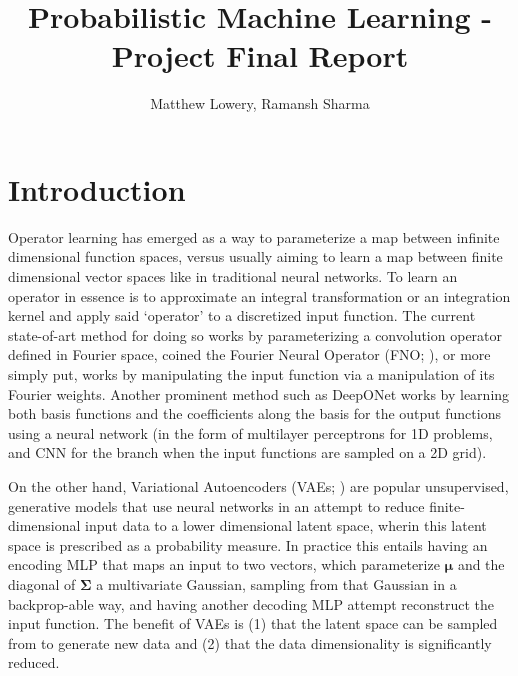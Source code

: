 \documentclass[11pt, fullpage,letterpaper]{article}
\title{Probabilistic Machine Learning - Project Final Report}
\author{Matthew Lowery, Ramansh Sharma}
\date{}
\begin{document}
\maketitle

\section{Introduction}

Operator learning has emerged as a way to parameterize a map between infinite dimensional function spaces, versus usually aiming to learn a map between finite dimensional vector spaces like in traditional neural networks. To learn an operator in essence is to approximate an integral transformation or an integration kernel and apply said `operator' to a discretized input function. The current state-of-art method for doing so works by parameterizing a convolution operator defined in Fourier space, coined the Fourier Neural Operator (FNO; \cite{li2021fourier}), or more simply put, works by manipulating the input function via a manipulation of its Fourier weights. Another prominent method such as DeepONet \cite{Lu_2021} works by learning both basis functions and the coefficients along the basis for the output functions using a neural network (in the form of multilayer perceptrons for 1D problems, and CNN for the branch when the input functions are sampled on a 2D grid).

On the other hand, Variational Autoencoders (VAEs; \cite{kingma2022autoencoding}) are popular unsupervised, generative models that use neural networks in an attempt to reduce finite-dimensional input data to a lower dimensional latent space, wherin this latent space is prescribed as a probability measure. In practice this entails having an encoding MLP that maps an input to two vectors, which parameterize $\mathbf{\mu}$ and the diagonal of $\mathbf{\Sigma}$ a multivariate Gaussian, sampling from that Gaussian in a backprop-able way, and having another decoding MLP attempt reconstruct the input function. The benefit of VAEs is (1) that the latent space can be sampled from to generate new data and (2) that the data dimensionality is significantly reduced.
\end{document}
